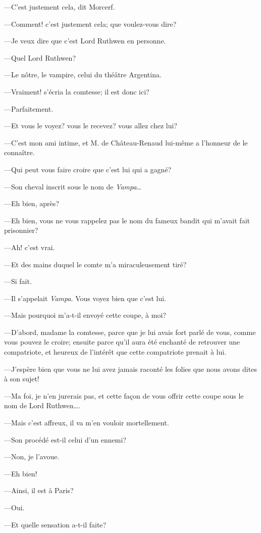 —C'est justement cela, dit Morcerf. 

—Comment! c'est justement cela; que voulez-vous dire? 

—Je veux dire que c'est Lord Ruthwen en personne. 

—Quel Lord Ruthwen? 

—Le nôtre, le vampire, celui du théâtre Argentina. 

—Vraiment! s'écria la comtesse; il est donc ici? 

—Parfaitement. 

—Et vous le voyez? vous le recevez? vous allez chez lui? 

—C'est mon ami intime, et M. de Château-Renaud lui-même a l'honneur de le connaître. 

—Qui peut vous faire croire que c'est lui qui a gagné? 

—Son cheval inscrit sous le nom de \textit{Vampa}\dots 

—Eh bien, après? 

—Eh bien, vous ne vous rappelez pas le nom du fameux bandit qui m'avait fait prisonnier? 

—Ah! c'est vrai. 

—Et des mains duquel le comte m'a miraculeusement tiré? 

—Si fait. 

—Il s'appelait \textit{Vampa}. Vous voyez bien que c'est lui. 

—Mais pourquoi m'a-t-il envoyé cette coupe, à moi? 

—D'abord, madame la comtesse, parce que je lui avais fort parlé de vous, comme vous pouvez le croire; ensuite parce qu'il aura été enchanté de retrouver une compatriote, et heureux de l'intérêt que cette compatriote prenait à lui. 

—J'espère bien que vous ne lui avez jamais raconté les folies que nous avons dites à son sujet! 

—Ma foi, je n'en jurerais pas, et cette façon de vous offrir cette coupe sous le nom de Lord Ruthwen\dots. 

—Mais c'est affreux, il va m'en vouloir mortellement. 

—Son procédé est-il celui d'un ennemi? 

—Non, je l'avoue. 

—Eh bien! 

—Ainsi, il est à Paris? 

—Oui. 

—Et quelle sensation a-t-il faite? 


